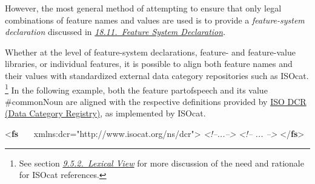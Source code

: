 However, the most general method of attempting to ensure that only legal combinations of feature names and values are used is to provide a \textit{feature-system declaration} discussed in \textit{\hyperref[FD]{18.11.\ Feature System Declaration}}.\par
Whether at the level of feature-system declarations, feature- and feature-value libraries, or individual features, it is possible to align both feature names and their values with standardized external data category repositories such as ISOcat. \footnote{See section \textit{\hyperref[DIMVLV]{9.5.2.\ Lexical View}} for more discussion of the need and rationale for ISOcat references.} In the following example, both the feature part\textunderscore of\textunderscore speech and its value \#commonNoun are aligned with the respective definitions provided by \hyperref[ISO-12620]{ISO DCR (Data Category Registry)}, as implemented by ISOcat. \par\bgroup{}\exampleFont \begin{shaded}\noindent\mbox{}{<\textbf{fs}\mbox{}\newline 
   xmlns:dcr="http://www.isocat.org/ns/dcr">}\mbox{}\newline 
\textit{<!--...-->}\mbox{}\newline 
{}\mbox{}\newline 
\textit{<!-- ... -->}\mbox{}\newline 
{</\textbf{fs}>}\end{shaded}\egroup\par 

